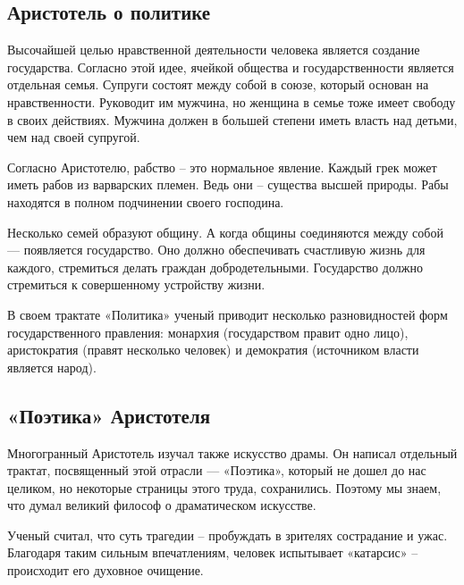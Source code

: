 \documentclass[
]{article}
\begin{document}
\hypertarget{ux430ux440ux438ux441ux442ux43eux442ux435ux43bux44c-ux43e-ux43fux43eux43bux438ux442ux438ux43aux435}{%
\subsection{Аристотель о
политике}\label{ux430ux440ux438ux441ux442ux43eux442ux435ux43bux44c-ux43e-ux43fux43eux43bux438ux442ux438ux43aux435}}

Высочайшей целью нравственной деятельности человека является создание
государства. Согласно этой идее, ячейкой общества и государственности
является отдельная семья. Супруги состоят между собой в союзе, который
основан на нравственности. Руководит им мужчина, но женщина в семье тоже
имеет свободу в своих действиях. Мужчина должен в большей степени иметь
власть над детьми, чем над своей супругой.

Согласно Аристотелю, рабство -- это нормальное явление. Каждый грек
может иметь рабов из варварских племен. Ведь они -- существа высшей
природы. Рабы находятся в полном подчинении своего господина.

Несколько семей образуют общину. А когда общины соединяются между собой
--- появляется государство. Оно должно обеспечивать счастливую жизнь для
каждого, стремиться делать граждан добродетельными. Государство должно
стремиться к совершенному устройству жизни.

В своем трактате «Политика» ученый приводит несколько разновидностей
форм государственного правления: монархия (государством правит одно
лицо), аристократия (правят несколько человек) и демократия (источником
власти является народ).

\hypertarget{ux43fux43eux44dux442ux438ux43aux430-ux430ux440ux438ux441ux442ux43eux442ux435ux43bux44f}{%
\subsection{«Поэтика»
Аристотеля}\label{ux43fux43eux44dux442ux438ux43aux430-ux430ux440ux438ux441ux442ux43eux442ux435ux43bux44f}}

Многогранный Аристотель изучал также искусство драмы. Он написал
отдельный трактат, посвященный этой отрасли --- «Поэтика», который не
дошел до нас целиком, но некоторые страницы этого труда, сохранились.
Поэтому мы знаем, что думал великий философ о драматическом искусстве.

Ученый считал, что суть трагедии -- пробуждать в зрителях сострадание и
ужас. Благодаря таким сильным впечатлениям, человек испытывает
«катарсис» -- происходит его духовное очищение.
\end{document}
